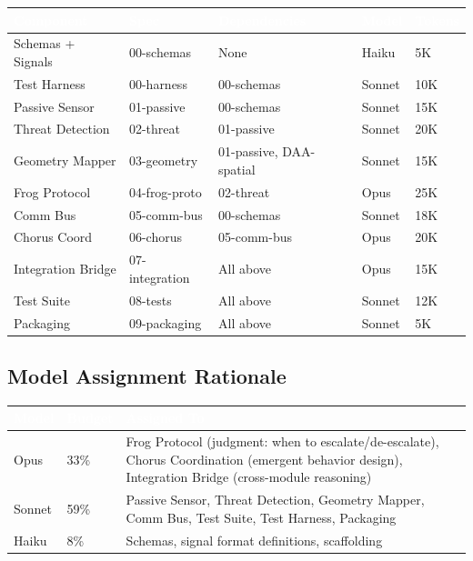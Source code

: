 \documentclass[11pt,letterpaper]{article}
\newcommand{\tableheader}[1]{\textbf{\sffamily\textcolor{white}{#1}}}
\begin{document}
\begin{center}
\begin{tabularx}{\textwidth}{L{3cm}L{1.8cm}L{2.5cm}C{1.3cm}C{1.3cm}}
\toprule
{}
\tableheader{Component} & \tableheader{Spec} & \tableheader{Dependencies} & \tableheader{Model} & \tableheader{Tokens} \\
\midrule
Schemas + Signals & 00-schemas & None & Haiku & 5K \\
Test Harness & 00-harness & 00-schemas & Sonnet & 10K \\
Passive Sensor & 01-passive & 00-schemas & Sonnet & 15K \\
Threat Detection & 02-threat & 01-passive & Sonnet & 20K \\
Geometry Mapper & 03-geometry & 01-passive, DAA-spatial & Sonnet & 15K \\
Frog Protocol & 04-frog-proto & 02-threat & Opus & 25K \\
Comm Bus & 05-comm-bus & 00-schemas & Sonnet & 18K \\
Chorus Coord & 06-chorus & 05-comm-bus & Opus & 20K \\
Integration Bridge & 07-integration & All above & Opus & 15K \\
Test Suite & 08-tests & All above & Sonnet & 12K \\
Packaging & 09-packaging & All above & Sonnet & 5K \\
\bottomrule
\end{tabularx}
\end{center}

\subsection{Model Assignment Rationale}

\begin{center}
\begin{tabularx}{\textwidth}{C{1.5cm}C{1.5cm}X}
\toprule
{}
\tableheader{Model} & \tableheader{Budget} & \tableheader{Assigned To} \\
\midrule
Opus & 33\% & Frog Protocol (judgment: when to escalate/de-escalate), Chorus Coordination (emergent behavior design), Integration Bridge (cross-module reasoning) \\
Sonnet & 59\% & Passive Sensor, Threat Detection, Geometry Mapper, Comm Bus, Test Suite, Test Harness, Packaging \\
Haiku & 8\% & Schemas, signal format definitions, scaffolding \\
\bottomrule
\end{tabularx}
\end{center}
\end{document}
